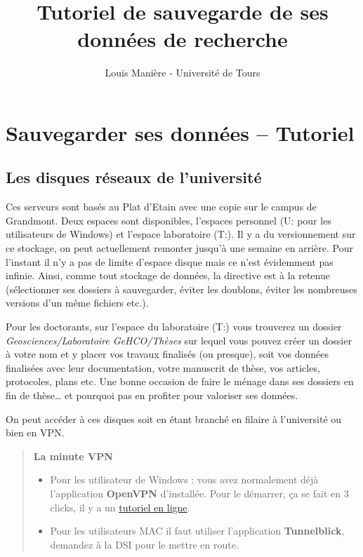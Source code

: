 \documentclass[
]{article}
\title{Tutoriel de sauvegarde de ses données de recherche}
\author{Louis Manière - Université de Tours}
\date{}
\begin{document}
\maketitle

\section{Sauvegarder ses données --
Tutoriel}\label{sauvegarder-ses-donnuxe9es-tutoriel}

\subsection{Les disques réseaux de l'université
💾}\label{les-disques-ruxe9seaux-de-luniversituxe9}

Ces serveurs sont basés au Plat d'Etain avec une copie sur le campus de
Grandmont. Deux espaces sont disponibles, l'espaces personnel (U: pour
les utilisateurs de Windows) et l'espace laboratoire (T:). Il y a du
versionnement sur ce stockage, on peut actuellement remonter jusqu'à une
semaine en arrière. Pour l'instant il n'y a pas de limite d'espace
disque mais ce n'est évidemment pas infinie. Ainsi, comme tout stockage
de données, la directive est à la retenue (sélectionner ses dossiers à
sauvegarder, éviter les doublons, éviter les nombreuses versions d'un
même fichiers etc.).

Pour les doctorants, sur l'espace du laboratoire (T:) vous trouverez un
dossier \emph{Geosciences/Laboratoire GeHCO/Thèses} sur lequel vous
pouvez créer un dossier à votre nom et y placer vos travaux finalisés
(ou presque), soit vos données finalisées avec leur documentation, votre
manuscrit de thèse, vos articles, protocoles, plans etc. Une bonne
occasion de faire le ménage dans ses dossiers en fin de thèse\ldots{} et
pourquoi pas en profiter pour valoriser ses données.

On peut accéder à ces disques soit en étant branché en filaire à
l'université ou bien en VPN.

\begin{quote}
\textbf{La minute VPN}

\begin{itemize}
\item
  Pour les utilisateur de Windows : vous avez normalement déjà
  l'application \textbf{OpenVPN} d'installée. Pour le démarrer, ça se
  fait en 3 clicks, il y a un
  \href{https://utmedia.univ-tours.fr/permalink/v12664e6412c0z39x92t/iframe/}{tutoriel
  en ligne}.
\item
  Pour les utilisateurs MAC il faut utiliser l'application
  \textbf{Tunnelblick}, demandez à la DSI pour le mettre en route.
\end{itemize}
\end{quote}
\end{document}
